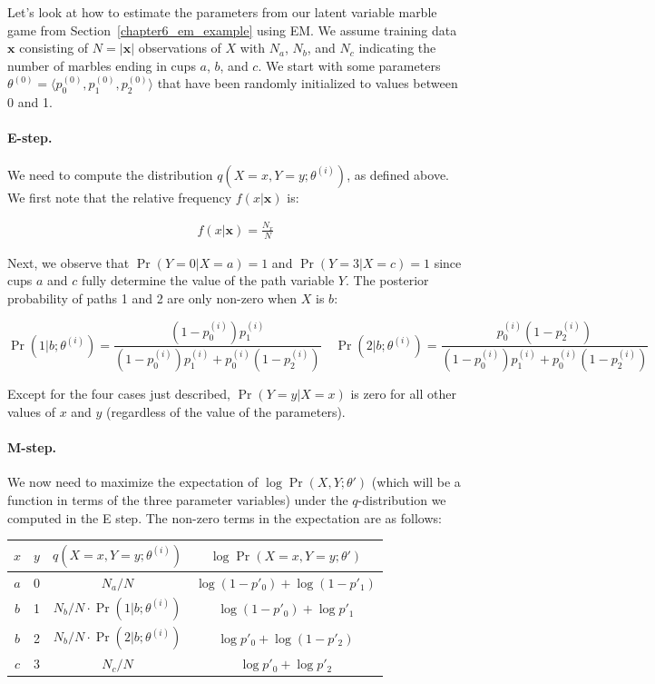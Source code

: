Let's look at how to estimate the parameters from our latent variable
marble game from Section~\ref{chapter6_em_example} using EM.  We
assume training data $\textbf{x}$ consisting of $N=|\textbf{x}|$
observations of $X$ with $N_a$, $N_b$, and $N_c$ indicating the number
of marbles ending in cups $a$, $b$, and $c$.  We start with some
parameters $\theta^{(0)}=\langle p_0^{(0)}, p_1^{(0)}, p_2^{(0)}
\rangle$ that have been randomly initialized to values between 0 and
1.

\paragraph{\bf E-step.}
We need to compute the distribution $q(X=x,Y=y;\theta^{(i)})$, as
defined above.  We first note that the relative frequency
$f(x|\textbf{x})$ is:

\begin{eqnarray*}
f(x|\textbf{x}) = \frac{N_x}{N}
\end{eqnarray*}

\noindent Next, we observe that $\Pr(Y=0|X=a)=1$ and $\Pr(Y=3|X=c)=1$
since cups $a$ and $c$ fully determine the value of the path variable
$Y$.  The posterior probability of paths 1 and 2 are only non-zero
when $X$ is $b$:

\begin{equation}
\Pr(1|b;\theta^{(i)}) = \frac{(1-p_0^{(i)}) p_1^{(i)}}{(1-p_0^{(i)}) p_1^{(i)} + p_0^{(i)} (1-p_2^{(i)})} \quad \Pr(2|b;\theta^{(i)}) = \frac{p_0^{(i)} (1-p_2^{(i)})}{(1-p_0^{(i)}) p_1^{(i)} + p_0^{(i)} (1-p_2^{(i)})}
\end{equation}

\noindent Except for the four cases just described, $\Pr(Y=y|X=x)$ is
zero for all other values of $x$ and $y$ (regardless of the value of
the parameters).

\paragraph{\bf M-step.}
We now need to maximize the expectation of $\log \Pr(X,Y;\theta')$
(which will be a function in terms of the three parameter variables)
under the $q$-distribution we computed in the E step.  The non-zero
terms in the expectation are as follows:

\begin{center}
\begin{tabular}{c|c|c|c}
$x$ & $y$ & $q(X=x,Y=y;\theta^{(i)})$ & $\log \Pr(X=x,Y=y;\theta')$ \\
\hline
$a$ & 0 & $N_a/N$ & $\log (1-p'_0) + \log (1 - p'_1)$ \\
$b$ & 1 & $N_b/N \cdot \Pr(1|b;\theta^{(i)}) $ & $\log(1 - p'_0) + \log p'_1$ \\
$b$ & 2 & $N_b/N \cdot \Pr(2|b;\theta^{(i)}) $ & $\log p'_0 + \log (1-p'_2)$ \\
$c$ & 3 & $N_c/N$ & $\log p'_0 + \log p'_2$ \\
\end{tabular}
\end{center}

